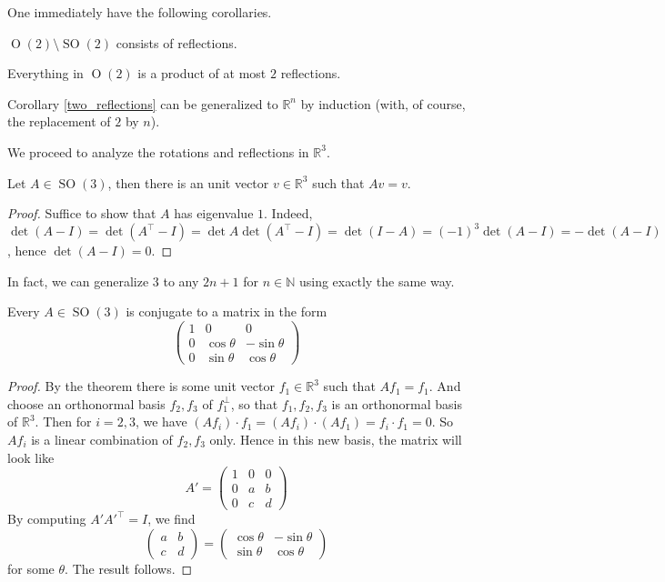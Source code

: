 One immediately have the following corollaries.
\begin{corollary}
    $\operatorname{O}(2)\setminus\operatorname{SO}(2)$ consists of reflections.
\end{corollary}
\begin{corollary}\label{two_reflections}
    Everything in $\operatorname{O}(2)$ is a product of at most $2$ reflections.
\end{corollary}
\begin{remark}
    Corollary \ref{two_reflections} can be generalized to $\mathbb R^n$ by induction (with, of course, the replacement of $2$ by $n$).
\end{remark}
We proceed to analyze the rotations and reflections in $\mathbb R^3$.
\begin{theorem}
    Let $A\in \operatorname{SO}(3)$, then there is an unit vector $v\in\mathbb R^3$ such that $Av=v$.
\end{theorem}
\begin{proof}
    Suffice to show that $A$ has eigenvalue $1$.
    Indeed, $\det(A-I)=\det(A^\top-I)=\det A\det (A^\top-I)=\det(I-A)=(-1)^3\det(A-I)=-\det(A-I)$, hence $\det(A-I)=0$.
\end{proof}
In fact, we can generalize $3$ to any $2n+1$ for $n\in\mathbb N$ using exactly the same way.
\begin{corollary}\label{SO3_conj}
    Every $A\in\operatorname{SO}(3)$ is conjugate to a matrix in the form
    $$\begin{pmatrix}
        1&0&0\\
        0&\cos\theta&-\sin\theta\\
        0&\sin\theta&\cos\theta
    \end{pmatrix}$$
\end{corollary}
\begin{proof}
    By the theorem there is some unit vector $f_1\in\mathbb R^3$ such that $Af_1=f_1$.
    And choose an orthonormal basis $f_2,f_3$ of $f_1^\perp$, so that $f_1,f_2,f_3$ is an orthonormal basis of $\mathbb R^3$.
    Then for $i=2,3$, we have $(Af_i)\cdot f_1=(Af_i)\cdot (Af_1)=f_i\cdot f_1=0$.
    So $Af_i$ is a linear combination of $f_2,f_3$ only.
    Hence in this new basis, the matrix will look like
    $$A'=\begin{pmatrix}
        1&0&0\\
        0&a&b\\
        0&c&d
    \end{pmatrix}$$
    By computing $A'A'^\top=I$, we find
    $$\begin{pmatrix}
        a&b\\
        c&d
    \end{pmatrix}=\begin{pmatrix}
        \cos\theta&-\sin\theta\\
        \sin\theta&\cos\theta
    \end{pmatrix}$$
    for some $\theta$.
    The result follows.
\end{proof}

